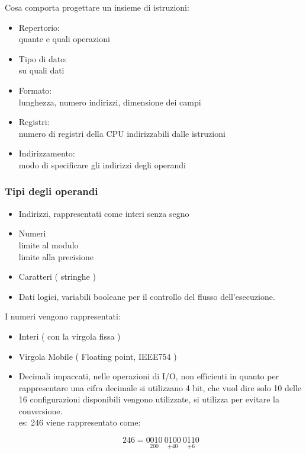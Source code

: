 \documentclass[12pt, a4paper]{report}
\begin{document}
Cosa comporta progettare un insieme di istruzioni:

\begin{itemize}
	\item Repertorio:\\
		quante e quali operazioni
	\item Tipo di dato:\\
		su quali dati
	\item Formato:\\
		lunghezza, numero indirizzi, dimensione dei campi
	\item Registri:\\
		numero di registri della CPU indirizzabili dalle istruzioni
	\item Indirizzamento:\\
		modo di specificare gli indirizzi degli operandi
\end{itemize}

\subsubsection{Tipi degli operandi}

\begin{itemize}
	\item Indirizzi, rappresentati come interi senza segno\\
	\item Numeri\\
		limite al modulo\\
		limite alla precisione\\
	\item Caratteri ( stringhe ) 
	\item Dati logici, variabili booleane per il controllo del flusso 
		dell'esecuzione.
\end{itemize}

I numeri vengono rappresentati:

\begin{itemize}
	\item Interi ( con la virgola fissa ) 
	\item Virgola Mobile ( Floating point, IEEE754 ) 
	\item Decimali impaccati, nelle operazioni di I/O,
		non efficienti in quanto per rappresentare una cifra decimale
		si utilizzano 4 bit, che vuol dire solo 10 delle 16 configurazioni
		disponibili vengono utilizzate, si utilizza per evitare la 
		conversione.\\
		es: 246 viene rappresentato come:

		\begin{equation}
			246 = \underset{200}{0010}\ \underset{ + 40	}{0100}\
			\underset{ + 6}{0110}
		\end{equation}
\end{itemize}
\end{document}
